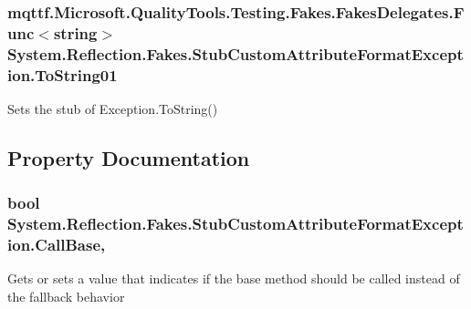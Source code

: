 \hypertarget{class_system_1_1_reflection_1_1_fakes_1_1_stub_custom_attribute_format_exception_a87efbcb6040b89901d92344487ba25b5}{
\subsubsection[{To\-String01}]{\setlength{\rightskip}{0pt plus 5cm}mqttf.\-Microsoft.\-Quality\-Tools.\-Testing.\-Fakes.\-Fakes\-Delegates.\-Func$<$string$>$ System.\-Reflection.\-Fakes.\-Stub\-Custom\-Attribute\-Format\-Exception.\-To\-String01}}\label{class_system_1_1_reflection_1_1_fakes_1_1_stub_custom_attribute_format_exception_a87efbcb6040b89901d92344487ba25b5}


Sets the stub of Exception.\-To\-String()



\subsection{Property Documentation}
\hypertarget{class_system_1_1_reflection_1_1_fakes_1_1_stub_custom_attribute_format_exception_a6d944167020bd7f18c85768c9ef231e2}{
\subsubsection[{Call\-Base}]{\setlength{\rightskip}{0pt plus 5cm}bool System.\-Reflection.\-Fakes.\-Stub\-Custom\-Attribute\-Format\-Exception.\-Call\-Base\hspace{0.3cm}{\ttfamily [get]}, {\ttfamily [set]}}}\label{class_system_1_1_reflection_1_1_fakes_1_1_stub_custom_attribute_format_exception_a6d944167020bd7f18c85768c9ef231e2}


Gets or sets a value that indicates if the base method should be called instead of the fallback behavior

